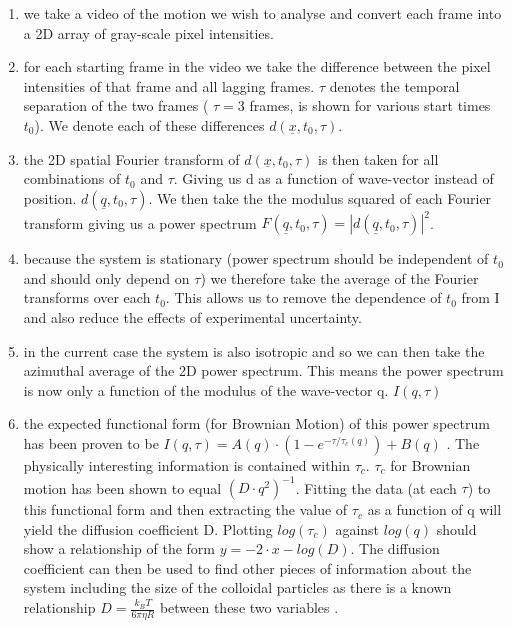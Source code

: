 \documentclass[10pt]{article}
\begin{document}
\begin{enumerate}[label=\alph*]
\item we take a video of the motion we wish to analyse and convert each frame into a 2D array of gray-scale pixel intensities.
\item for each starting frame in the video we take the difference between the pixel intensities of that frame and all lagging frames. $ \tau $ 
denotes the temporal separation of the two frames ( $ \tau = 3 $ frames,  is shown for various start times $ t_0 $). We denote each of these differences $ d(\underline{x}, t_0, \tau) $.
\item the 2D spatial Fourier transform of $ d(\underline{x}, t_0, \tau) $ is then taken for all combinations of $ t_0 $ and $ \tau $. Giving us d as a function of wave-vector instead of position. $ d(\underline{q}, t_0, \tau) $. We then take the the modulus squared of each Fourier transform giving us a power spectrum $F(\underline{q}, t_0, \tau) = |d(\underline{q}, t_0, \tau)|^2$.
\item because the system is stationary (power spectrum should be independent of $t_0$ and should only depend on $\tau$) we therefore take the average of the Fourier transforms over each $t_0$. This allows us to remove the dependence of $t_0$ from I and also reduce the effects of experimental uncertainty.
\item in the current case the system is also isotropic and so we can then take the azimuthal average of the 2D power spectrum. This means the power spectrum is now only a function of the modulus of the wave-vector q. $I(q, \tau)$
\item the expected functional form (for Brownian Motion) of this power spectrum has been proven to be $I(q, \tau) = A(q) \cdot (1 - e^{-\tau / \tau_c (q)}) + B(q)$ \cite{DLSPecora}. The physically interesting information is contained within $\tau_c$. $\tau_c$ for Brownian motion has been shown to equal $(D \cdot q^2)^{-1}$. Fitting the data (at each $\tau$) to this functional form and then extracting the value of $\tau_c$ as a function of q will yield the diffusion coefficient D. Plotting $log(\tau_c)$ against $log(q)$ should show a relationship of the form $y = -2\cdot x - log(D)$. The diffusion coefficient can then be used to find other pieces of information about the system including the size of the colloidal particles as there is a known relationship $D=\frac{k_B T}{6 \pi \eta R}$ between these two variables \cite{wynot_2002}.
\end{enumerate}
\end{document}
